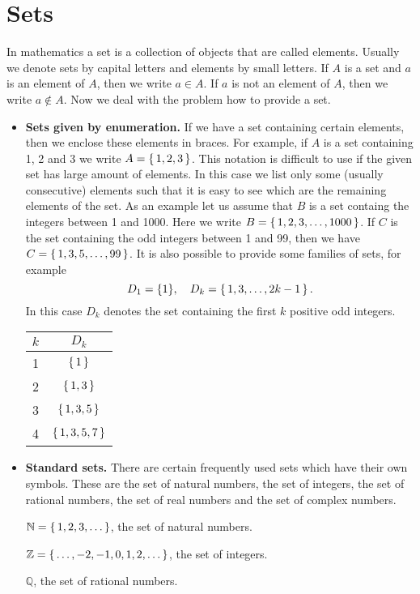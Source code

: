 \section{Sets}\label{sec:sets}
In mathematics a set is a collection of objects that are called elements. Usually we denote sets by capital letters
and elements by small letters.
If $A$ is a set and $a$ is an element of $A$, then we write $a\in A$. If $a$ is not an element of $A$, then we write
$a\notin A$. Now we deal with the problem how to provide a set.
\begin{itemize}
\item \textbf{Sets given by enumeration.} If we have a set containing certain elements, then we enclose these elements
in braces. For example, if $A$ is a set containing 1, 2 and 3 we write $A=\left\{\,1,2,3\,\right\}$. This notation is difficult to use
if the given set has large amount of elements. In this case we list only some (usually consecutive) elements such that
it is easy to see which are the remaining elements of the set. As an example let us assume that $B$ is a set containg
the integers between 1 and 1000. Here we write $B=\left\{\,1,2,3,\ldots,1000\,\right\}$. If $C$ is the set containing the odd integers
between 1 and 99, then we have $C=\left\{\,1,3,5,\ldots,99\,\right\}$. It is also possible to provide some families of sets, for example
$$D_1=\{1\},\quad D_k=\left\{\,1,3,\ldots,2k-1\,\right\}.$$ 
In this case $D_k$ denotes the set containing the first $k$ positive odd integers.
\begin{center}
\begin{tabular}{|c|c|}
\hline
$k$ & $D_k$\\
\hline
1 & $\left\{\,1\,\right\}$\\
\hline
2 & $\left\{\,1,3\,\right\}$\\
\hline
3 & $\left\{\,1,3,5\,\right\}$\\
\hline
4 & $\left\{\,1,3,5,7\,\right\}$\\
\hline
\end{tabular}
\end{center}
\item \textbf{Standard sets.} There are certain frequently used sets which have their own symbols. These are the
set of natural numbers, the set of integers, the set of rational numbers, the set of real numbers and the set of
complex numbers.

$\mathbb{N}=\left\{\,1,2,3,\ldots\,\right\}$, the set of natural numbers.

$\mathbb{Z}=\left\{\,\ldots,-2,-1,0,1,2,\ldots\,\right\}$, the set of integers.

$\mathbb{Q}$, the set of rational numbers.


\end{itemize}
